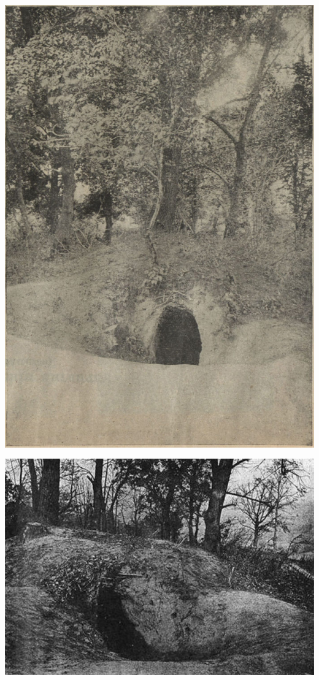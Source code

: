 \newpage
\vspace*{\fill}
\begin{center}
\includegraphics[width=\linewidth]{chast-kirvys/beylis/1912-beylis-01.jpg}
\end{center}
\vspace*{\fill}
\newpage

\begin{center}
\includegraphics[width=\linewidth]{chast-kirvys/beylis/beylis-peshera-02.jpg}
\end{center}

